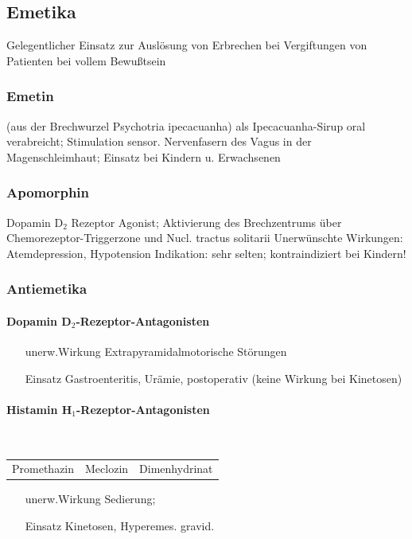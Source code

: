 \documentclass[10pt,a4paper]{report}
\begin{document}
\subsection{Emetika} %
\label{sub:emetika}
Gelegentlicher Einsatz zur Auslösung von Erbrechen bei Vergiftungen von Patienten bei vollem Bewußtsein
\subsubsection{Emetin} %
\label{ssub:emetin}
(aus der Brechwurzel Psychotria ipecacuanha) als Ipecacuanha-Sirup oral verabreicht; Stimulation sensor. Nervenfasern des Vagus in der Magenschleimhaut; Einsatz bei Kindern u. Erwachsenen 
\subsubsection{Apomorphin} %
\label{ssub:apomorphin}
Dopamin D$_2$ Rezeptor Agonist; Aktivierung des Brechzentrums über Chemorezeptor-Triggerzone und Nucl. tractus solitarii Unerwünschte Wirkungen: Atemdepression, Hypotension Indikation: sehr selten; kontraindiziert bei Kindern!
\subsubsection{Antiemetika} %
\label{ssub:antiemetika}
\paragraph{Dopamin D$_2$-Rezeptor-Antagonisten} %
\label{par:dopamin_d__2_rezeptor_antagonisten}
\begin{itemize}
	\item[unerw.Wirkung] Extrapyramidalmotorische Störungen
   	\item[Einsatz] Gastroenteritis, Urämie, postoperativ (keine Wirkung bei Kinetosen)
\end{itemize}
\paragraph{Histamin H$_1$-Rezeptor-Antagonisten} %
\label{par:histamin_h__1_rezeptor_antagonisten}
\mbox{}\\
\begin{tabularx}{\textwidth}{XXX}
Promethazin&Meclozin&Dimenhydrinat\\
\end{tabularx}
\begin{itemize}
	\item[unerw.Wirkung] Sedierung; 
	\item[Einsatz] Kinetosen, Hyperemes. gravid.
\end{itemize}
\end{document}
